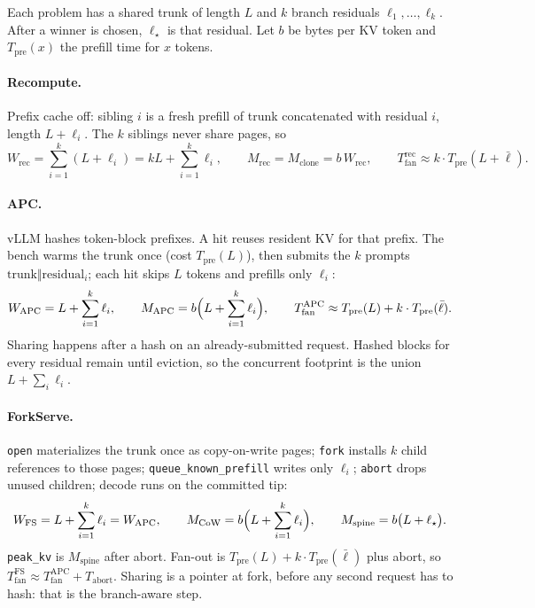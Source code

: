 \documentclass[11pt,a4paper]{article}
\begin{document}
Each problem has a shared trunk of length $L$ and $k$ branch residuals $\ell_1,\ldots,\ell_k$.
After a winner is chosen, $\ell_{\star}$ is that residual.
Let $b$ be bytes per KV token and $T_{\mathrm{pre}}(x)$ the prefill time for $x$ tokens.

\paragraph{Recompute.}
Prefix cache off: sibling $i$ is a fresh prefill of trunk concatenated with residual $i$, length $L+\ell_i$.
The $k$ siblings never share pages, so
\begin{equation}
\label{eq:rec}
W_{\mathrm{rec}}
  =\sum_{i=1}^{k}(L+\ell_i)
  =kL+\sum_{i=1}^{k}\ell_i,
\qquad
M_{\mathrm{rec}}
  = M_{\mathrm{clone}}
  = b\,W_{\mathrm{rec}},
\qquad
T_{\mathrm{fan}}^{\mathrm{rec}}
  \approx k\cdot T_{\mathrm{pre}}(L+\bar\ell).
\end{equation}

\paragraph{APC.}
vLLM hashes token-block prefixes.
A hit reuses resident KV for that prefix.
The bench warms the trunk once (cost $T_{\mathrm{pre}}(L)$), then submits the $k$ prompts $\mathrm{trunk}\Vert\mathrm{residual}_i$; each hit skips $L$ tokens and prefills only $\ell_i$:
\begin{equation}
\label{eq:apc}
W_{\mathrm{APC}}
  =L+\sum_{i=1}^{k}\ell_i,
\qquad
M_{\mathrm{APC}}
  = b\Bigl(L+\sum_{i=1}^{k}\ell_i\Bigr),
\qquad
T_{\mathrm{fan}}^{\mathrm{APC}}
  \approx T_{\mathrm{pre}}(L)+k\cdot T_{\mathrm{pre}}(\bar\ell).
\end{equation}
Sharing happens after a hash on an already-submitted request.
Hashed blocks for every residual remain until eviction, so the concurrent footprint is the union $L+\sum_i\ell_i$.

\paragraph{ForkServe.}
\texttt{open} materializes the trunk once as copy-on-write pages; \texttt{fork} installs $k$ child references to those pages; \texttt{queue\_known\_prefill} writes only $\ell_i$; \texttt{abort} drops unused children; decode runs on the committed tip:
\begin{equation}
\label{eq:fs}
W_{\mathrm{FS}}
  =L+\sum_{i=1}^{k}\ell_i
  =W_{\mathrm{APC}},
\qquad
M_{\mathrm{CoW}}
  = b\Bigl(L+\sum_{i=1}^{k}\ell_i\Bigr),
\qquad
M_{\mathrm{spine}}
  = b\bigl(L+\ell_{\star}\bigr).
\end{equation}
\texttt{peak\_kv} is $M_{\mathrm{spine}}$ after abort.
Fan-out is $T_{\mathrm{pre}}(L)+k\cdot T_{\mathrm{pre}}(\bar\ell)$ plus abort, so $T_{\mathrm{fan}}^{\mathrm{FS}}\approx T_{\mathrm{fan}}^{\mathrm{APC}}+T_{\mathrm{abort}}$.
Sharing is a pointer at fork, before any second request has to hash: that is the branch-aware step.
\end{document}
